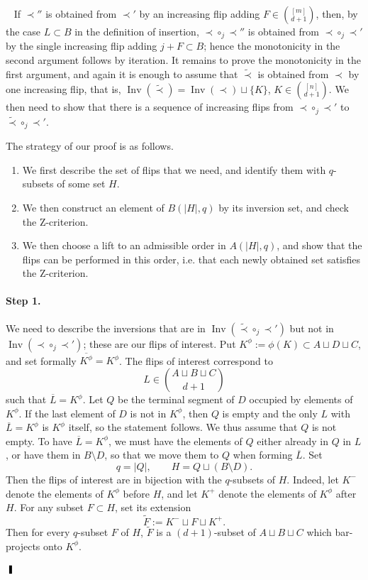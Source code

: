 \documentclass[12pt,a4paper]{article}
\newenvironment{proof}{\noindent{\bf Proof}~}%
{\hfill$\qed$\medskip}
\def\qed{ \ \vrule width.1cm height.3cm depth0cm}
\def\bar{\overline}
\def\bar{\overline}
\begin{document}
\begin{proof}
If \(\prec''\) is obtained from \(\prec'\) by an increasing flip adding
\(F\in\binom{[m]}{d+1}\), then, by the case \(L\subset B\) in the definition of
insertion, \(\prec\circ_j\prec''\) is obtained from \(\prec\circ_j\prec'\) by the
single increasing flip adding \(j+F\subset B\); hence the monotonicity in the second
argument follows by iteration.  It remains to prove the monotonicity in the first
argument, and again it is enough to assume that \(\widetilde{\prec}\) is obtained
from \(\prec\) by one increasing flip, that is,
\(\operatorname{Inv}(\widetilde{\prec})=\operatorname{Inv}(\prec)\sqcup\{K\}\),
\(K\in\binom{[n]}{d+1}\). We then need to show that there is a sequence of increasing
flips from \(\prec\circ_j\prec'\) to \(\widetilde{\prec}\circ_j\prec'\).

The strategy of our proof is as follows.
\begin{enumerate}
    \item We first describe the set of flips that we need, and identify them with
    \(q\)-subsets of some set \(H\).
    \item We then construct an element of \(B(|H|,q)\) by its inversion set, and check
    the Z-criterion.
    \item We then choose a lift to an admissible order in \(A(|H|,q)\), and show that
    the flips can be performed in this order, i.e. that each newly obtained set satisfies
    the Z-criterion.
\end{enumerate}

\paragraph{Step 1.}
We need to describe the inversions that are in
\(\operatorname{Inv}(\widetilde{\prec}\circ_j\prec')\) but not in
\(\operatorname{Inv}(\prec\circ_j\prec')\); these are our flips of interest. Put
\(K^\phi:=\phi(K)\subset A\sqcup D\sqcup C\), and set formally
\(\overline{K^\phi}=K^\phi\). The flips of interest correspond to
\[
L \in \binom{A \sqcup B \sqcup C}{d+1}
\]
such that \(\bar L = K^\phi\). Let \(Q\) be the terminal segment of \(D\) occupied by
elements of \(K^\phi\). If the last element of \(D\) is not in \(K^\phi\), then \(Q\) is
empty and the only \(L\) with \(\bar L=K^\phi\) is \(K^\phi\) itself, so the statement
follows. We thus assume that \(Q\) is not empty.
To have \(\bar L=K^\phi\), we must have the elements of \(Q\) either already in \(Q\)
in \(L\), or have them in \(B\setminus D\), so that we move them to \(Q\) when forming
\(\bar L\). Set
\[
q = |Q|,
\qquad
H = Q \sqcup (B \setminus D).
\]
Then the flips of interest are in bijection with the \(q\)-subsets of \(H\). Indeed, let
\(K^{-}\) denote the elements of \(K^\phi\) before \(H\), and let \(K^{+}\) denote the
elements of \(K^\phi\) after \(H\). For any subset \(F \subset H\), set its extension
\[
\widetilde F := K^{-} \sqcup F \sqcup K^{+}.
\]
Then for every \(q\)-subset \(F\) of \(H\), \(\widetilde F\) is a \((d+1)\)-subset of
\(A \sqcup B \sqcup C\) which bar-projects onto \(K^\phi\).


\end{proof}
\end{document}
